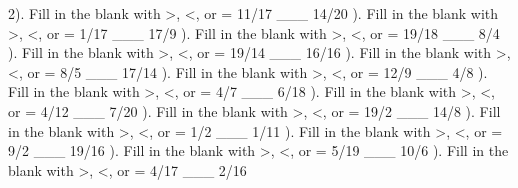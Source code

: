 \documentclass{article}%
\begin{document}
2). Fill in the blank with >, <, or = 11/17 \_\_\_ 14/20%
\newline%
\newline%
). Fill in the blank with >, <, or = 1/17 \_\_\_ 17/9%
\newline%
\newline%
). Fill in the blank with >, <, or = 19/18 \_\_\_ 8/4%
\newline%
\newline%
). Fill in the blank with >, <, or = 19/14 \_\_\_ 16/16%
\newline%
\newline%
). Fill in the blank with >, <, or = 8/5 \_\_\_ 17/14%
\newline%
\newline%
). Fill in the blank with >, <, or = 12/9 \_\_\_ 4/8%
\newline%
\newline%
). Fill in the blank with >, <, or = 4/7 \_\_\_ 6/18%
\newline%
\newline%
). Fill in the blank with >, <, or = 4/12 \_\_\_ 7/20%
\newline%
\newline%
). Fill in the blank with >, <, or = 19/2 \_\_\_ 14/8%
\newline%
\newline%
). Fill in the blank with >, <, or = 1/2 \_\_\_ 1/11%
\newline%
\newline%
). Fill in the blank with >, <, or = 9/2 \_\_\_ 19/16%
\newline%
\newline%
). Fill in the blank with >, <, or = 5/19 \_\_\_ 10/6%
\newline%
\newline%
). Fill in the blank with >, <, or = 4/17 \_\_\_ 2/16%
\newline%
\newline%
\end{document}
